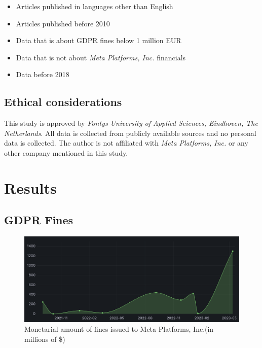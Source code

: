 \documentclass[12pt, a4paper]{article}
\begin{document}
\begin{itemize}
    \item Articles published in languages other than English
    \item Articles published before 2010
    \item Data that is about GDPR fines below 1 million EUR
    \item Data that is not about \textit{Meta Platforms, Inc.} financials
    \item Data before 2018
\end{itemize}

\subsection*{Ethical considerations}

This study is approved by \textit{Fontys University of Applied Sciences,
Eindhoven, The Netherlands}. All data is collected from publicly available
sources and no personal data is collected. The author is not affiliated with
\textit{Meta Platforms, Inc.} or any other company mentioned in this study.

\section*{Results}

\subsection*{GDPR Fines}

\begin{figure}[H]
    \centering
    \includegraphics[width=1.00\textwidth]{monetarial-amount-of-gdpr-fines}
    \caption{Monetarial amount of fines issued to Meta Platforms, Inc.(in
    millions of
    \$)\cite{gdprFine1,gdprFine2,gdprFine3,gdprFine4,gdprFine5,gdprFine6,gdprFine7,gdprFine8,gdprFine9}}
    \label{fig:amount-of-gdpr-fines}
\end{figure}
\end{document}
